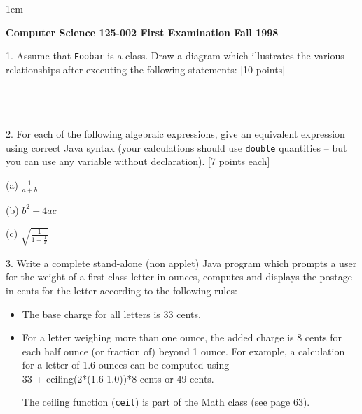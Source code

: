 \parskip 1em
\topmargin 1pt \headheight 1pt \headsep 2pt \footskip 1pt 
\oddsidemargin -10pt \evensidemargin -10pt \parindent 0pt
\setlength\textheight{700pt}
\setlength\textwidth{500pt}





{\bf Computer Science 125-002 \hfill First Examination \hfill Fall 1998}

1. Assume that {\tt Foobar} is a class.  Draw a diagram which
illustrates the various relationships after executing the following
statements: [10 points]

\hspace*{.5in}{\tt Foobar a;}\\
\hspace*{.5in}{\tt Foobar b = new Foobar();}\\
\hspace*{.5in}{\tt Foobar a = b;}\\

2. For each of the following algebraic expressions, give an 
equivalent expression using correct Java syntax (your 
calculations should use {\tt double} quantities -- but
you can use any variable without declaration).  [7 points each]



(a) $\displaystyle{\frac{1}{a + b}}$

(b) $\displaystyle{b^2 - 4ac}$

(c) $\displaystyle{\sqrt{\frac{1}{1 + \frac{1}{x}}}}$


3. Write a complete stand-alone (non applet) Java program which
prompts a user for the weight of a first-class letter in ounces, computes
and displays the postage in cents for the letter according to the
following rules:

\begin{itemize}
\item The base charge for all letters is 33 cents.
\item For a letter weighing more than one ounce,
the added charge is 8 cents for each half ounce (or
fraction of) beyond 1 ounce.  For example, a calculation
for a letter of 
1.6 ounces can be computed using\\

\hspace*{.5in}33 + ceiling(2*(1.6-1.0))*8 cents or 49 cents.

The ceiling function ({\tt ceil}) is
part of the Math class (see page 63).
\end{itemize}

